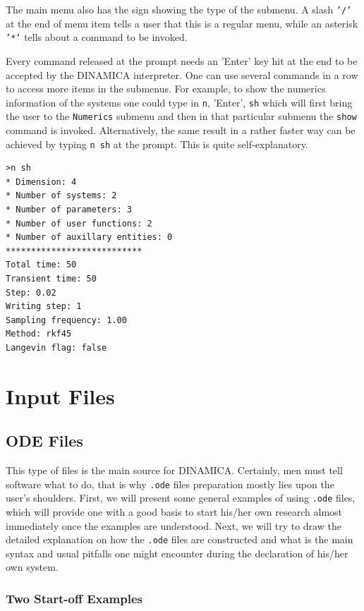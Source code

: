 \documentclass[11pt,a4paper]{article}
\begin{document}
The main menu also has the sign showing the type of the submenu. A slash \texttt{'/'}
at the end of menu item tells a user that this is a regular menu, while an asterisk
\texttt{'*'} tells about a command to be invoked.

Every command released at the prompt needs an 'Enter' key hit at the end to be
accepted by the DINAMICA interpreter. One can use several commands in a row to access
more items in the submenus. For example, to show the numerics information of the
systems one could type in \texttt{n}, 'Enter', \texttt{sh} which will first bring the
user to the \texttt{Numerics} submenu and then in that particular submenu the
\texttt{show} command is invoked. Alternatively, the same result in a rather faster
way can be achieved by typing \texttt{n sh} at the prompt. This is quite
self-explanatory.
\begin{verbatim}
>n sh
* Dimension: 4
* Number of systems: 2
* Number of parameters: 3
* Number of user functions: 2
* Number of auxillary entities: 0
***************************
Total time: 50
Transient time: 50
Step: 0.02
Writing step: 1
Sampling frequency: 1.00
Method: rkf45
Langevin flag: false
\end{verbatim}



\section{Input Files}
\label{sec:input-files}

\subsection{ODE Files}
\label{sec:ode-files}

This type of files is the main source for DINAMICA. Certainly, men must tell software
what to do, that is why \texttt{.ode} files preparation mostly lies upon the user's
shoulders. First, we will present some general examples of using \texttt{.ode} files,
which will provide one with a good basis to start his/her own research almost
immediately once the examples are understood. Next, we will try to draw the detailed
explanation on how the \texttt{.ode} files are constructed and what is the main
syntax and usual pitfalls one might encounter during the declaration of his/her own
system.

\subsubsection{Two Start-off Examples}
\label{sec:two-start-examples}
\end{document}
